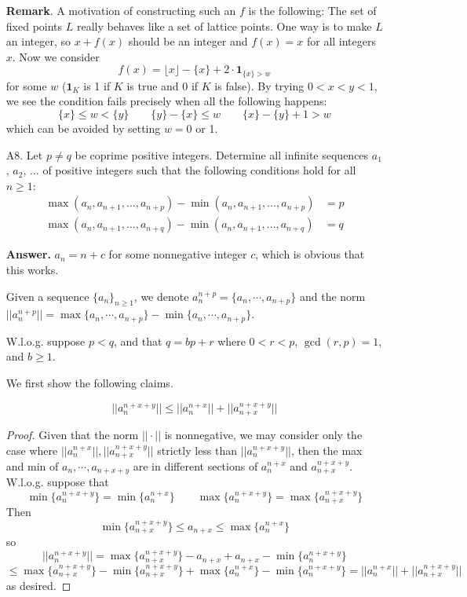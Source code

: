 \documentclass[11pt,a4paper]{article}
\begin{document}
\begin{enumerate}
		\textbf{Remark}. 
		A motivation of constructing such an $f$ is the following: 
		The set of fixed points $L$ really behaves like a set of lattice points. One way is to make $L$ an integer, so $x + f(x)$ should be an integer and $f(x)=x$ for all integers $x$. Now we consider 
		\[f(x) = \lfloor x\rfloor - \{x\} + 2\cdot\boldsymbol{1}_{\{x\} > w}\] for some $w$ ($\boldsymbol{1}_{K}$ is 1 if $K$ is true and 0 if $K$ is false).
		By trying $0 < x < y < 1$, we see the condition fails precisely when all the following happens: 
		\[
		\{x\} \le w < \{y\}\qquad \{y\} - \{x\}\le w\qquad 
		\{x\} -\{y\} + 1 > w
		\]
		which can be avoided by setting $w = 0$ or 1. 
		
		
		\item [A8.] 
		Let $p \ne q$ be coprime positive integers. Determine all infinite sequences $a_1$, $a_2$, $\dots$ of positive integers such that the following conditions hold for all $n \ge 1$:
		\begin{align*}
			\max(a_n, a_{n+1}, \dots, a_{n+p}) - \min(a_n, a_{n+1}, \dots, a_{n+p}) &= p \\
			\max(a_n, a_{n+1}, \dots, a_{n+q}) - \min(a_n, a_{n+1}, \dots, a_{n+q}) &= q   
		\end{align*}
		
		\textbf{Answer. } $a_n = n+c$ for some nonnegative integer $c$, 
		which is obvious that this works. 
		
		Given a sequence $\{a_n\}_{n\ge 1}$, 
		we denote $a_n^{n+p}=\{a_n, \cdots, a_{n+p}\}$ and the norm 
		$||a_n^{n+p}|| = \max\{a_n, \cdots, a_{n+p}\} - \min \{a_n, \cdots, a_{n+p}\}$. 
		
		W.l.o.g. suppose $p < q$, 
		and that $q = bp+r$ where $0 < r < p$, $\gcd(r, p) = 1$, 
		and $b \ge 1$. 
		
		We first show the following claims. 
		\begin{lemma}
			\[
			||a_n^{n+x+y}||\le ||a_n^{n+x}|| + ||a_{n+x}^{n+x+y}||
			\]
		\end{lemma}
		
		\begin{proof}
			Given that the norm $||\cdot||$ is nonnegative, 
			we may consider only the case where $ ||a_n^{n+x}||, ||a_{n+x}^{n+x+y}||$ strictly less than $||a_n^{n+x+y}||$, 
			then the max and min of 
			$a_n,\cdots, a_{n+x+y}$ are in different sections of 
			$a_n^{n+x}$ and $a_{n+x}^{n+x+y}$. 
			W.l.o.g. suppose that 
			\[
			\min\{a_n^{n+x+y}\} = \min\{a_n^{n+x}\}
			\qquad 
			\max\{a_n^{n+x+y}\} = \max\{a_{n+x}^{n+x+y}\}
			\]
			Then 
			\[
			\min\{a_{n+x}^{n+x+y}\}\le 
			a_{n+x}
			\le \max\{a_n^{n+x}\}
			\]
			so 
			\[
			||a_n^{n+x+y}||
			=\max\{a_{n+x}^{n+x+y}\} - a_{n+x}
			+a_{n+x} - \min\{a_n^{n+x+y}\}
			\]\[
			\le \max\{a_{n+x}^{n+x+y}\} - \min\{a_{n+x}^{n+x+y}\}
			+\max\{a_n^{n+x}\}- \min\{a_n^{n+x+y}\}
			=||a_n^{n+x}|| + ||a_{n+x}^{n+x+y}||
			\]
			as desired. 
		\end{proof}
		

\end{enumerate}
\end{document}
